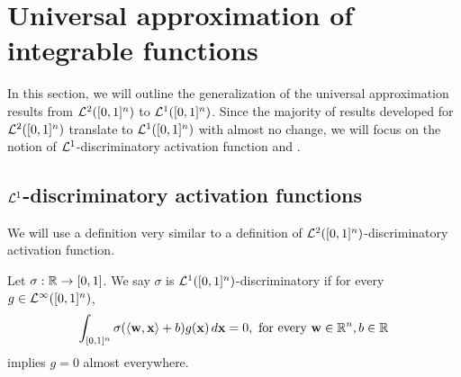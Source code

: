 \section{Universal approximation of integrable functions}
\label{section:universality:lone}
In this section, we will outline the generalization of the universal approximation results from ${\mathcal {L}^2}([0,1]^n)$ to ${\mathcal {L}^1}([0,1]^n)$. Since the majority of results developed for ${\mathcal {L}^2}([0,1]^n)$ translate to ${\mathcal {L}^1}([0,1]^n)$ with almost no change, we will focus on the notion of ${\mathcal {L}^1}$-discriminatory activation function and .
\subsection{${\mathcal {L}^1}$-discriminatory activation functions}
\label{subsection:universality:lone:1}
We will use a definition very similar to a definition of ${\mathcal {L}^2}([0,1]^n)$-discriminatory activation function.
\begin{definition}
Let $\sigma : {\mathbb R} \to [0,1]$. We say $\sigma$ is ${\mathcal {L}^1}([0,1]^n)$-discriminatory if for every $g \in {\mathcal {L}^\infty}([0,1]^n)$, \[
    \int_{[0,1]^n} \sigma(\langle \mathbf{w}, \mathbf{x} \rangle + b) g(\mathbf{x}) \, d \mathbf{x} = 0, \text{ for every } \mathbf{w} \in {\mathbb R}^n, b \in {\mathbb R}
\]
implies $g = 0$ almost everywhere.
\end{definition}
